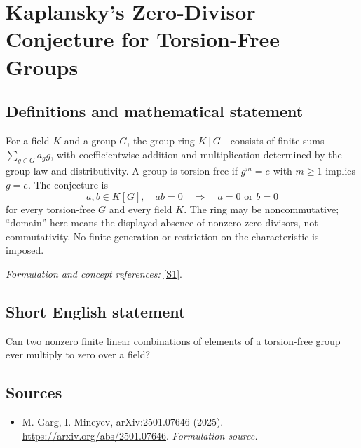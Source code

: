 \documentclass[11pt]{article}
\begin{document}
\section*{\texorpdfstring{Kaplansky's Zero-Divisor Conjecture for Torsion-Free Groups}{Kaplansky's Zero-Divisor Conjecture for Torsion-Free Groups}}\label{30006789}
\subsection{Definitions and mathematical statement}
For a field $K$ and a group $G$, the group ring $K[G]$ consists of finite sums $\sum_{g\in G}a_gg$, with coefficientwise addition and multiplication determined by the group law and distributivity. A group is torsion-free if $g^m=e$ with $m\ge1$ implies $g=e$. The conjecture is
\[
 a,b\in K[G],\quad ab=0\quad\Longrightarrow\quad a=0\text{ or }b=0
\]
for every torsion-free $G$ and every field $K$. The ring may be noncommutative; ``domain'' here means the displayed absence of nonzero zero-divisors, not commutativity. No finite generation or restriction on the characteristic is imposed.
\par\smallskip\textit{Formulation and concept references:} \href{https://arxiv.org/abs/2501.07646}{[S1]}.

\subsection{Short English statement}
Can two nonzero finite linear combinations of elements of a torsion-free group ever multiply to zero over a field?
\subsection{Sources}
\begin{itemize}
\item[S1]M. Garg, I. Mineyev, arXiv:2501.07646 (2025).
\url{https://arxiv.org/abs/2501.07646}.
\textit{Formulation source.}
\end{itemize}
\end{document}
